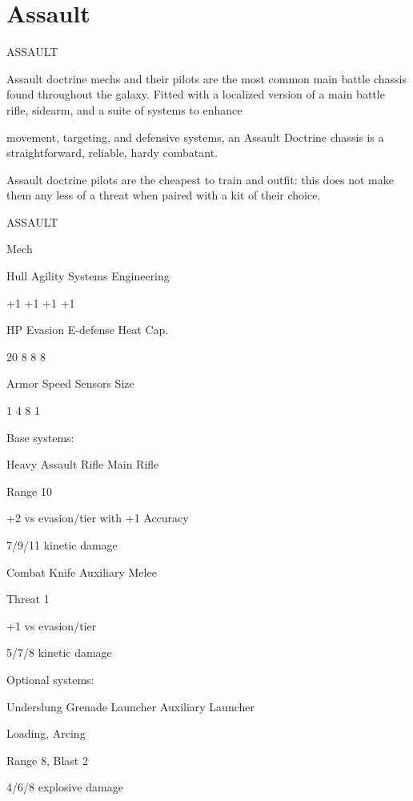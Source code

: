 \section{Assault}
                                                ASSAULT  

Assault doctrine mechs and their pilots are the most common main battle chassis found throughout the  
galaxy. Fitted with a localized version of a main battle rifle, sidearm, and a suite of systems to enhance  

movement, targeting, and defensive systems, an Assault Doctrine chassis is a straightforward, reliable,  
hardy combatant.   

Assault doctrine pilots are the cheapest to train and outfit: this does not make them any less of a threat  
when paired with a kit of their choice.   

       ASSAULT 

       Mech 

       Hull       Agility      Systems       Engineering 

       +1         +1           +1            +1 

       HP         Evasion      E-defense     Heat Cap. 

       20         8            8             8 

       Armor      Speed        Sensors       Size 

       1          4            8             1 

Base systems:
 
Heavy Assault Rifle  
Main Rifle
 
Range 10
 
+2 vs evasion/tier with +1 Accuracy
 
7/9/11 kinetic damage
 

Combat Knife  
Auxiliary Melee
 
Threat 1
 
+1 vs evasion/tier
 
5/7/8 kinetic damage
 

                                                                                                           


Optional systems:
 
Underslung Grenade Launcher  
Auxiliary Launcher
 
Loading, Arcing
 
Range 8, Blast 2
 
4/6/8 explosive damage
 

